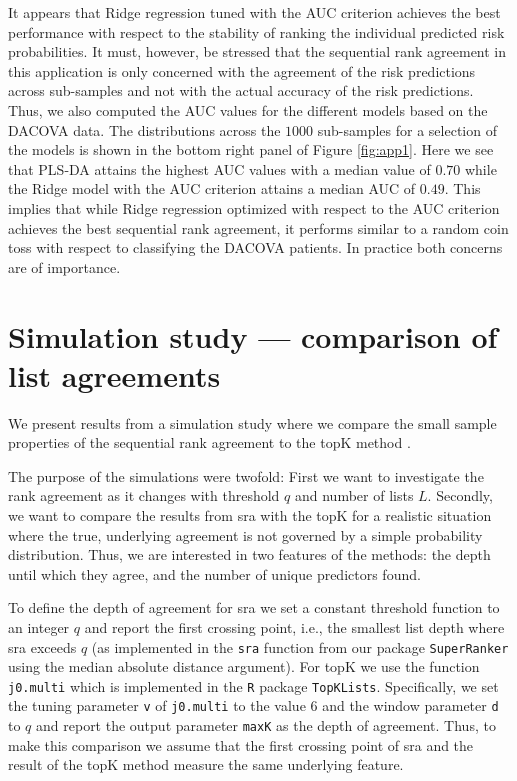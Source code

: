 \documentclass[oupdraft]{bio}
\newcommand{\added}[1]{{\color{added}{}#1}}
\begin{document}
It appears that Ridge regression tuned with the AUC criterion achieves
the best performance with respect to the stability of ranking the
individual predicted risk probabilities. It must, however, be stressed
that the sequential rank agreement in this application is only
concerned with the agreement of the risk predictions across
sub-samples and not with the actual accuracy of the risk
predictions. Thus, we also computed the AUC values for the different models
based on the DACOVA data. The distributions across the $1000$
sub-samples for a selection of the models is shown in the bottom right panel
of Figure \ref{fig:app1}.  Here we see that PLS-DA attains the highest
AUC values with a median value of $0.70$ while the Ridge model with
the AUC criterion attains a median AUC of $0.49$. This implies that
while Ridge regression optimized with respect to the AUC criterion
achieves the best sequential rank agreement, it performs similar to a
random coin toss with respect to classifying the DACOVA patients.
In practice both concerns are of importance.


\section{Simulation study --- comparison of list agreements}

We present results from a simulation study where we compare the small
sample properties of the sequential rank agreement to the topK method
\citep{hall:schi:2012}.
\added{The purpose of the simulations were twofold: First we want to
  investigate the rank agreement as it changes with threshold $q$ and
  number of lists $L$. Secondly, we want to compare the results from sra with the topK for a realistic situation where
  the true, underlying agreement is not governed by a simple
  probability distribution. Thus, we are interested in two features of
  the methods: the depth until which they agree, and the number of
  unique predictors found.

  To define the depth of agreement for sra we set a constant threshold
  function to an integer $q$ and report the first crossing point,
  i.e., the smallest list depth where sra exceeds $q$ (as implemented
  in the \texttt{sra} function from our package \texttt{SuperRanker} using
  the median absolute distance argument). For topK we use the function
  \texttt{j0.multi} which is implemented in the \texttt{R} package
  \texttt{TopKLists}. Specifically, we set the tuning parameter
  \texttt{v} of \texttt{j0.multi} to the value 6 and the window
  parameter \texttt{d} to $q$ and report the output parameter
  \texttt{maxK} as the depth of agreement. Thus, to make this
  comparison we assume that the first crossing point of sra and the
  result of the topK method measure the same underlying feature. }
\end{document}
